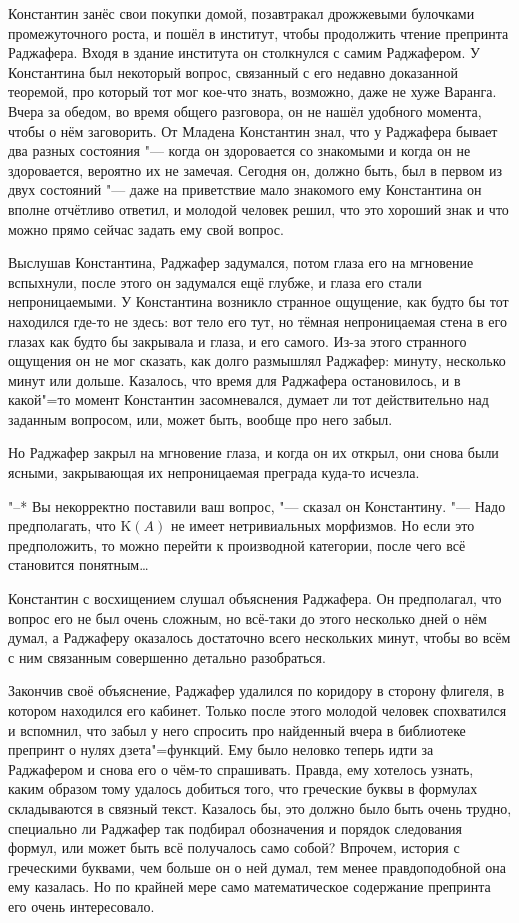 Константин занёс свои покупки домой, позавтракал дрожжевыми булочками
промежуточного роста, и пошёл в институт, чтобы продолжить чтение препринта
Раджафера.
Входя в здание института он столкнулся с самим Раджафером.
У Константина был некоторый вопрос, связанный с его недавно доказанной теоремой,
про который тот мог кое-что знать, возможно, даже не хуже Варанга.
Вчера за обедом, во время общего разговора, он не нашёл удобного момента, чтобы
о нём заговорить.
От Младена Константин знал, что у Раджафера бывает два разных состояния "---
когда он здоровается со знакомыми и когда он не здоровается, вероятно их не
замечая.
Сегодня он, должно быть, был в первом из двух состояний "--- даже на приветствие
мало знакомого ему Константина он вполне отчётливо ответил, и молодой человек
решил, что это хороший знак и что можно прямо сейчас задать ему свой вопрос.

Выслушав Константина, Раджафер задумался, потом глаза его на мгновение
вспыхнули, после этого он задумался ещё глубже, и глаза его стали
непроницаемыми.
У Константина возникло странное ощущение, как будто бы тот находился где-то не
здесь: вот тело его тут, но тёмная непроницаемая стена в его глазах как будто бы
закрывала и глаза, и его самого.
Из-за этого странного ощущения он не мог сказать, как долго размышлял Раджафер:
минуту, несколько минут или дольше.
Казалось, что время для Раджафера остановилось, и в какой"=то момент Константин
засомневался, думает ли тот действительно над заданным вопросом, или, может
быть, вообще про него забыл.

Но Раджафер закрыл на мгновение глаза, и когда он их открыл, они снова были
ясными, закрывающая их непроницаемая преграда куда-то исчезла.

"--* Вы некорректно поставили ваш вопрос, "--- сказал он Константину.
"--- Надо предполагать, что $\mathrm{K}(A)$ не имеет нетривиальных морфизмов.
Но если это предположить, то можно перейти к производной категории, после чего
всё становится понятным\ldots

Константин с восхищением слушал объяснения Раджафера.
Он предполагал, что вопрос его не был очень сложным, но всё-таки до этого
несколько дней о нём думал, а Раджаферу оказалось достаточно всего нескольких
минут, чтобы во всём с ним связанным совершенно детально разобраться.

Закончив своё объяснение, Раджафер удалился по коридору в сторону флигеля, в
котором находился его кабинет.
Только после этого молодой человек спохватился и вспомнил, что забыл у него
спросить про найденный вчера в библиотеке препринт о нулях дзета"=функций.
Ему было неловко теперь идти за Раджафером и снова его о чём-то спрашивать.
Правда, ему хотелось узнать, каким образом тому удалось добиться того, что
греческие буквы в формулах складываются в связный текст.
Казалось бы, это должно было быть очень трудно, специально ли Раджафер так
подбирал обозначения и порядок следования формул, или может быть всё получалось
само собой?
Впрочем, история с греческими буквами, чем больше он о ней думал, тем менее
правдоподобной она ему казалась.
Но по крайней мере само математическое содержание препринта его очень
интересовало.

